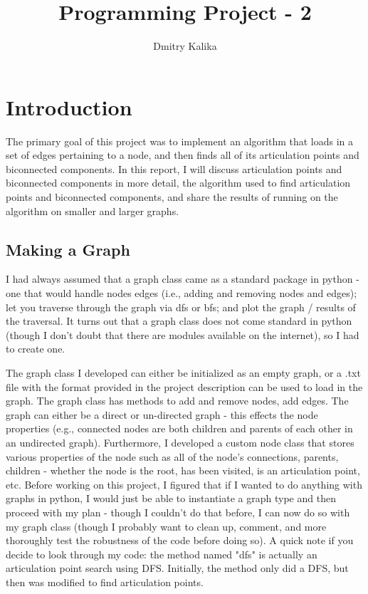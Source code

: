\documentclass[]{article}
\title{Programming Project - 2}
\author{Dmitry Kalika}
\begin{document}
\maketitle


\section{Introduction}
The primary goal of this project was to implement an algorithm that loads in a set of edges pertaining to a node, and then finds all of its articulation points and biconnected components. In this report, I will discuss articulation points and biconnected components in more detail, the algorithm used to find articulation points and biconnected components, and share the results of running on the algorithm on smaller and larger graphs.
\subsection{Making a Graph} 

I had always assumed that a graph class came as a standard package in python - one that would handle nodes edges (i.e., adding and removing nodes and edges); let you traverse through the graph via dfs or bfs; and plot the graph / results of the traversal. It turns out that a graph class does not come standard in python (though I don't doubt that there are modules available on the internet), so I had to create one.

The graph class I developed can either be initialized as an empty graph, or a .txt file with the format provided in the project description can be used to load in the graph. The graph class has methods to add and remove nodes, add edges. The graph can either be a direct or un-directed graph - this effects the node properties (e.g., connected nodes are both children and parents of each other in an undirected graph). Furthermore, I developed a custom node class that stores various properties of the node such as all of the node's connections, parents, children - whether the node is the root, has been visited, is an articulation point, etc. Before working on this project, I figured that if I wanted to do anything with graphs in python, I would just be able to instantiate a graph type and then proceed with my plan - though I couldn't do that before, I can now do so with my graph class (though I probably want to clean up, comment, and more thoroughly test the robustness of the code before doing so). A quick note if you decide to look through my code: the method named "dfs" is actually an articulation point search using DFS. Initially, the method only did a DFS, but then was modified to find articulation points.
\end{document}
